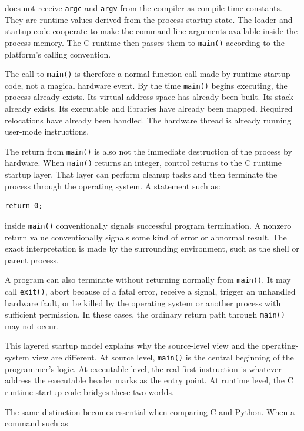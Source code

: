 does not receive \texttt{argc} and \texttt{argv} from the compiler as compile-time constants. They are runtime values derived from the process startup state. The loader and startup code cooperate to make the command-line arguments available inside the process memory. The C runtime then passes them to \texttt{main()} according to the platform's calling convention.

The call to \texttt{main()} is therefore a normal function call made by runtime startup code, not a magical hardware event. By the time \texttt{main()} begins executing, the process already exists. Its virtual address space has already been built. Its stack already exists. Its executable and libraries have already been mapped. Required relocations have already been handled. The hardware thread is already running user-mode instructions.

The return from \texttt{main()} is also not the immediate destruction of the process by hardware. When \texttt{main()} returns an integer, control returns to the C runtime startup layer. That layer can perform cleanup tasks and then terminate the process through the operating system. A statement such as:

\begin{verbatim}
return 0;
\end{verbatim}

inside \texttt{main()} conventionally signals successful program termination. A nonzero return value conventionally signals some kind of error or abnormal result. The exact interpretation is made by the surrounding environment, such as the shell or parent process.

A program can also terminate without returning normally from \texttt{main()}. It may call \texttt{exit()}, abort because of a fatal error, receive a signal, trigger an unhandled hardware fault, or be killed by the operating system or another process with sufficient permission. In these cases, the ordinary return path through \texttt{main()} may not occur.

This layered startup model explains why the source-level view and the operating-system view are different. At source level, \texttt{main()} is the central beginning of the programmer's logic. At executable level, the real first instruction is whatever address the executable header marks as the entry point. At runtime level, the C runtime startup code bridges these two worlds.

The same distinction becomes essential when comparing C and Python. When a command such as

